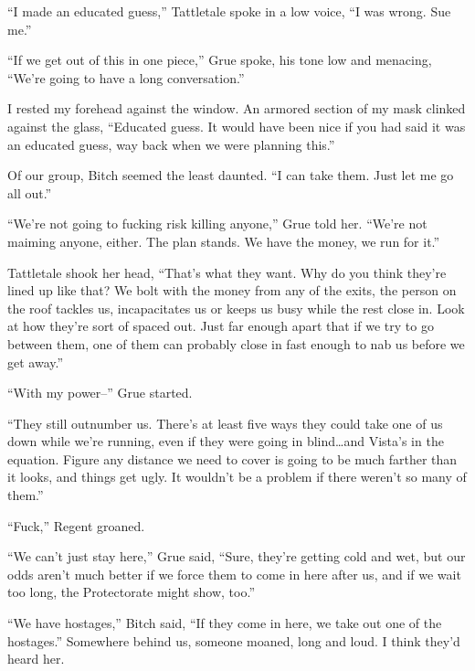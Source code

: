 ``I made an educated guess,'' Tattletale spoke in a low voice, ``I was wrong.  Sue me.''



``If we get out of this in one piece,'' Grue spoke, his tone low and menacing, ``We're going to have a long conversation.''



I rested my forehead against the window.  An armored section of my mask clinked against the glass, ``Educated guess.  It would have been nice if you had said it was an educated guess, way back when we were planning this.''



Of our group, Bitch seemed the least daunted.  ``I can take them.  Just let me go all out.''



``We're not going to fucking risk killing anyone,'' Grue told her. ``We're not maiming anyone, either. The plan stands.  We have the money, we run for it.''



Tattletale shook her head, ``That's what they want. Why do you think they're lined up like that? We bolt with the money from any of the exits, the person on the roof tackles us, incapacitates us or keeps us busy while the rest close in.  Look at how they're sort of spaced out.  Just far enough apart that if we try to go between them, one of them can probably close in fast enough to nab us before we get away.''



``With my power--'' Grue started.



``They still outnumber us. There's at least five ways they could take one of us down while we're running, even if they were going in blind\ldots and Vista's in the equation. Figure any distance we need to cover is going to be much farther than it looks, and things get ugly. It wouldn't be a problem if there weren't so many of them.''



``Fuck,'' Regent groaned.



``We can't just stay here,'' Grue said, ``Sure, they're getting cold and wet, but our odds aren't much better if we force them to come in here after us, and if we wait too long, the Protectorate might show, too.''



``We have hostages,'' Bitch said, ``If they come in here, we take out one of the hostages.''  Somewhere behind us, someone moaned, long and loud. I think they'd heard her.



